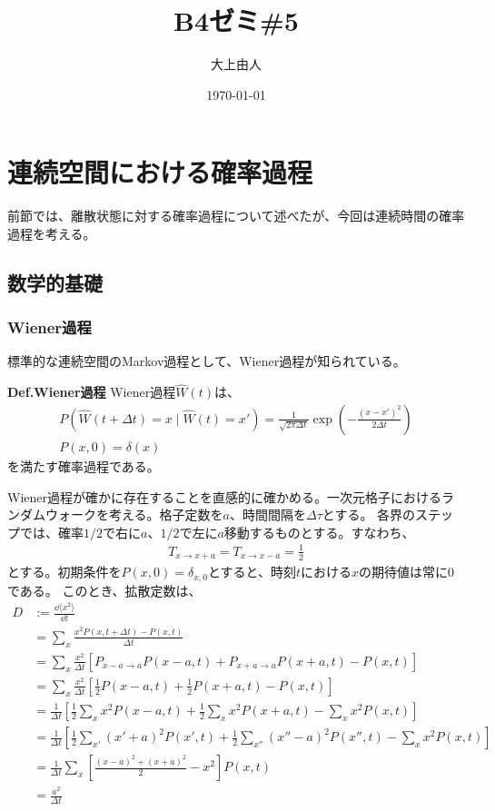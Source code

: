 \documentclass[a4paper,11pt]{jsarticle}
\numberwithin{equation}{section}
\begin{document}
\title{B4ゼミ\#5}
\author{大上由人}
\date{\today}
\maketitle

\setcounter{section}{3}
\section{連続空間における確率過程}
前節では、離散状態に対する確率過程について述べたが、今回は連続時間の確率過程を考える。
\subsection{数学的基礎}
\subsubsection{Wiener過程}
標準的な連続空間のMarkov過程として、Wiener過程が知られている。
\begin{itembox}[l]{\textbf{Def.Wiener過程}}
    Wiener過程$\hat{W}(t)$は、
    \begin{align}
        P(\hat{W}(t+\Delta t)=x \mid \hat{W}(t)=x') = \frac{1}{\sqrt{2\pi \Delta t}} \exp(-\frac{(x-x')^2}{2\Delta t})\\
        P(x,0)=\delta(x)
    \end{align}
    を満たす確率過程である。
\end{itembox}
Wiener過程が確かに存在することを直感的に確かめる。一次元格子におけるランダムウォークを考える。格子定数を$a$、時間間隔を$\Delta \tau$とする。
各界のステップでは、確率$1/2$で右に$a$、$1/2$で左に$a$移動するものとする。すなわち、
\begin{align}
    T_{x \to x+a} = T_{x \to x-a} = \frac{1}{2}
\end{align}
とする。初期条件を$P(x,0)=\delta_{x,0}$とすると、時刻$t$における$x$の期待値は常に0である。
このとき、拡散定数は、
\begin{align}
    D &:= \frac{\dd{\langle x^2 \rangle}}{\dd{t}} \\
  &= \sum_{x} \frac{ x^2 P(x,t + \Delta t) - P(x,t)}{\Delta t} \\
  &= \sum_{x} \frac{x^2}{\Delta t} \left[ P_{x-a \rightarrow a} P(x - a, t) + P_{x + a \rightarrow a} P(x + a, t) - P(x,t) \right] \\
  &= \sum_{x} \frac{x^2}{\Delta t} \left[ \frac{1}{2} P(x - a, t) + \frac{1}{2} P(x + a, t) - P(x,t) \right] \\
  &= \frac{1}{\Delta t} \left[ \frac{1}{2} \sum_{x} x^2 P(x - a, t) + \frac{1}{2} \sum_{x} x^2 P(x + a, t) - \sum_{x} x^2 P(x,t) \right] \\
  &= \frac{1}{\Delta t} \left[ \frac{1}{2} \sum_{x'} (x' + a)^2 P(x', t) + \frac{1}{2} \sum_{x''} (x'' - a)^2 P(x'', t) - \sum_{x} x^2 P(x,t) \right] \\
  &= \frac{1}{\Delta t} \sum_{x} \left[ \frac{(x - a)^2 + (x + a)^2}{2} - x^2 \right] P(x,t) \\
  &= \frac{a^2}{\Delta t} 
\end{align}
\end{document}
